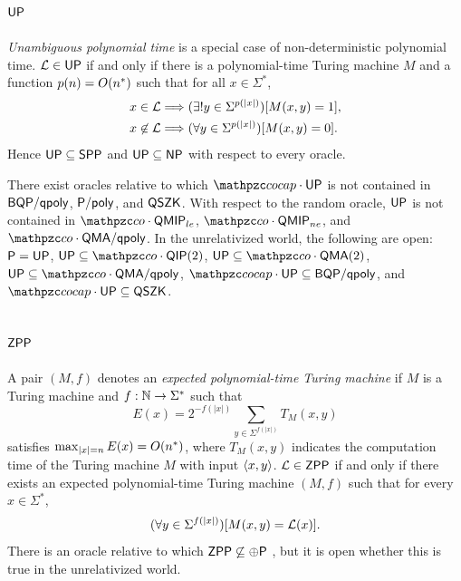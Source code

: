 \subsection{$\mathsf{UP}$}\label{up-section}

\textit{Unambiguous polynomial time} is a special case of non-deterministic 
polynomial time. $\mathcal{L}\in\mathsf{UP}$ if and only if there is a polynomial-time 
Turing machine $M$ and a function $p(n)=O(n^*)$ such that for all 
$x\in\Sigma^*$,
\begin{align*}
x\in\mathcal{L}&\Longrightarrow(\exists!y\in\Sigma^{p(|x|)})[M(x,y)=1], \\
x\not\in\mathcal{L}&\Longrightarrow(\forall y\in\Sigma^{p(|x|)})[M(x,y)=0].
\end{align*}
Hence $\mathsf{UP}\subseteq\mathsf{SPP}$ and $\mathsf{UP}\subseteq\mathsf{NP}$ with respect
to every oracle.

There exist oracles relative to which $\cocap\cdot\msf{UP}$ is not contained in
$\mathsf{BQP}/\mathsf{qpoly}$, $\mathsf{P}/\mathsf{poly}$, and $\mathsf{QSZK}$. With respect to the 
random oracle, $\mathsf{UP}$ is not contained in $\cco\cdot\msf{QMIP}_{le}$, 
$\cco\cdot\msf{QMIP}_{ne}$, and $\cco\cdot\msf{QMA}/\msf{qpoly}$. In the 
unrelativized world, the following are open: $\mathsf{P}=\mathsf{UP}$, 
$\msf{UP}\subseteq\cco\cdot\msf{QIP}(2)$, $\msf{UP}\subseteq\cco\cdot\msf{QMA}(2)$, 
$\msf{UP}\subseteq\cco\cdot\msf{QMA}/\msf{qpoly}$, 
$\cocap\cdot\msf{UP}\subseteq\msf{BQP}/\msf{qpoly}$, and 
$\cocap\cdot\msf{UP}\subseteq\msf{QSZK}$.

\subsection{$\mathsf{ZPP}$}

A pair $(M,f)$ denotes an \textit{expected polynomial-time Turing machine} if 
$M$ is a Turing machine and $f:\mathbb{N}\rightarrow\Sigma^*$ such that
\[
E(x)=2^{-f(|x|)}\sum_{y\in\Sigma^{f(|x|)}}T_M(x,y)
\]
satisfies $\max_{|x|=n}E(x)=O(n^*)$,
where $T_M(x,y)$ indicates the computation time of the Turing machine $M$ with 
input $\left\langle x,y\right\rangle$. $\mathcal{L}\in\mathsf{ZPP}$ if and only if there exists an expected 
polynomial-time Turing machine $(M,f)$ such that for every $x\in\Sigma^*$,
\[
(\forall y\in\Sigma^{f(|x|)})[M(x,y)=\mathcal{L}(x)].
\]
There is an oracle relative to which $\mathsf{ZPP}\not\subseteq\oplus\mathsf{P}$ 
\cite{Beigel:1998:NME:276698.276737}, but it is open whether this is true in 
the unrelativized world.